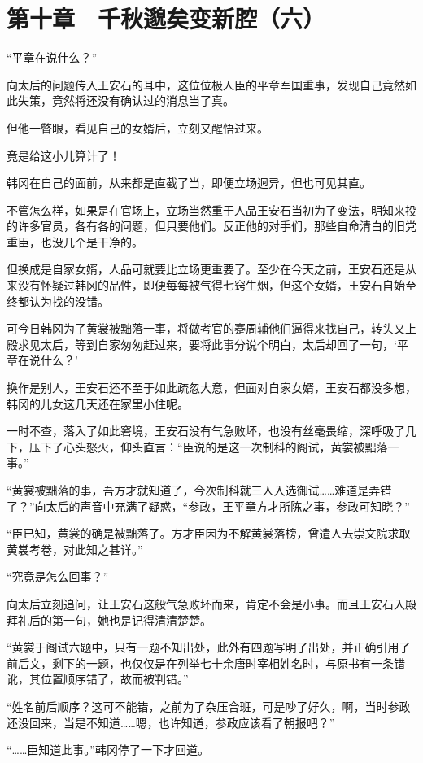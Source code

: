 \section{第十章　千秋邈矣变新腔（六）}

“平章在说什么？”

向太后的问题传入王安石的耳中，这位位极人臣的平章军国重事，发现自己竟然如此失策，竟然将还没有确认过的消息当了真。

但他一瞥眼，看见自己的女婿后，立刻又醒悟过来。

竟是给这小儿算计了！

韩冈在自己的面前，从来都是直截了当，即便立场迥异，但也可见其直。

不管怎么样，如果是在官场上，立场当然重于人品王安石当初为了变法，明知来投的许多官员，各有各的问题，但只要他们。反正他的对手们，那些自命清白的旧党重臣，也没几个是干净的。

但换成是自家女婿，人品可就要比立场更重要了。至少在今天之前，王安石还是从来没有怀疑过韩冈的品性，即便每每被气得七窍生烟，但这个女婿，王安石自始至终都认为找的没错。

可今日韩冈为了黄裳被黜落一事，将做考官的蹇周辅他们逼得来找自己，转头又上殿求见太后，等到自家匆匆赶过来，要将此事分说个明白，太后却回了一句，‘平章在说什么？’

换作是别人，王安石还不至于如此疏忽大意，但面对自家女婿，王安石都没多想，韩冈的儿女这几天还在家里小住呢。

一时不查，落入了如此窘境，王安石没有气急败坏，也没有丝毫畏缩，深呼吸了几下，压下了心头怒火，仰头直言：“臣说的是这一次制科的阁试，黄裳被黜落一事。”

“黄裳被黜落的事，吾方才就知道了，今次制科就三人入选御试……难道是弄错了？”向太后的声音中充满了疑惑，“参政，王平章方才所陈之事，参政可知晓？”

“臣已知，黄裳的确是被黜落了。方才臣因为不解黄裳落榜，曾遣人去崇文院求取黄裳考卷，对此知之甚详。”

“究竟是怎么回事？”

向太后立刻追问，让王安石这般气急败坏而来，肯定不会是小事。而且王安石入殿拜礼后的第一句，她也是记得清清楚楚。

“黄裳于阁试六题中，只有一题不知出处，此外有四题写明了出处，并正确引用了前后文，剩下的一题，也仅仅是在列举七十余唐时宰相姓名时，与原书有一条错讹，其位置顺序错了，故而被判错。”

“姓名前后顺序？这可不能错，之前为了杂压合班，可是吵了好久，啊，当时参政还没回来，当是不知道……嗯，也许知道，参政应该看了朝报吧？”

“……臣知道此事。”韩冈停了一下才回道。

